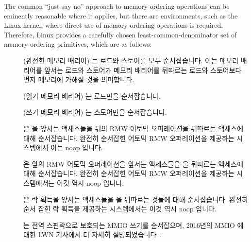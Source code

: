 The common ``just say no'' approach to memory-ordering operations
can be eminently reasonable where it applies,
but there are environments, such as the Linux kernel, where direct
use of memory-ordering operations is required.
Therefore,
Linux provides a carefully chosen least-common-denominator
set of memory-ordering primitives, which are as follows:

\fi

\begin{description}
\item	[] (완전한 메모리 배리어) 는 로드와 스토어를 모두
	순서잡습니다.
	이는 메모리 배리어를 앞서는 로드와 스토어가 메모리 배리어를 뒤따르는
	로드와 스토어보다 먼저 메모리에 가해질 것을 의미합니다.
\item	[] (읽기 메모리 배리어) 는 로드만을 순서잡습니다.
\item	[] (쓰기 메모리 배리어) 는 스토어만을 순서잡습니다.
\item	[] 은  을
	앞서는 액세스들을 뒤의 RMW 어토믹 오퍼레이션을 뒤따르는 액세스에 대해
	순서잡습니다.
	완전히 순서잡힌 어토믹 RMW 오퍼레이션을 제공하는 시스템에서 이는 noop
	입니다.
\item	[] 은 앞의 RMW 어토믹 오퍼레이션을 앞서는
	액세스들을  을 뒤따르는 액세스에 대해
	순서잡습니다.
	완전히 순서잡힌 어토믹 RMW 오퍼레이션을 제공하는 시스템에서는 이것 역시
	noop 입니다.
\item	[] 은 락 획득을 앞서는 액세스들을
	 을 뒤따르는 것들에 대해 순서잡습니다.
	완전히 순서 잡힌 락 획득을 제공하는 시스템에서는 이것 역시 noop 입니다.
\item	[] 는 전역 스핀락으로 보호되는 MMIO 쓰기를 순서잡으며,
	2016년의 MMIO 에 대한 LWN 기사에서 더 자세히
	설명되었습니다~\cite{PaulEMcKenney2016LinuxKernelMMIO}.

\iffalse


\end{description}
